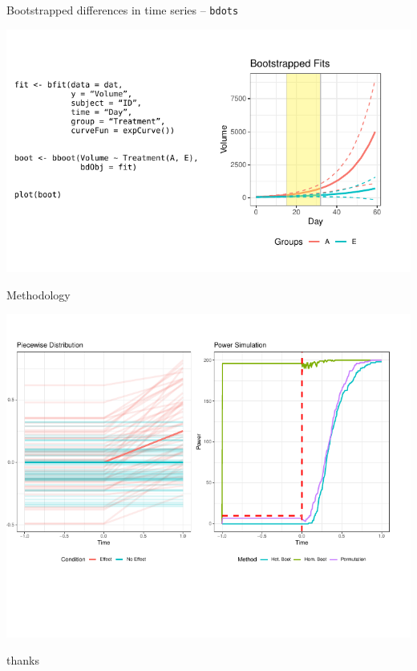 \documentclass{beamer}
\begin{document}
\begin{frame}{Bootstrapped differences in time series -- \texttt{bdots}}
\vspace{-1mm}
\begin{center}
\includegraphics{bdots_examples.pdf}
\end{center}
\end{frame}


\begin{frame}{Methodology}
\vspace{-7mm}
\begin{center}
\includegraphics{method_image.pdf}
\end{center}
\end{frame}




\begin{frame}
\centering
thanks
\end{frame}
\end{document}
